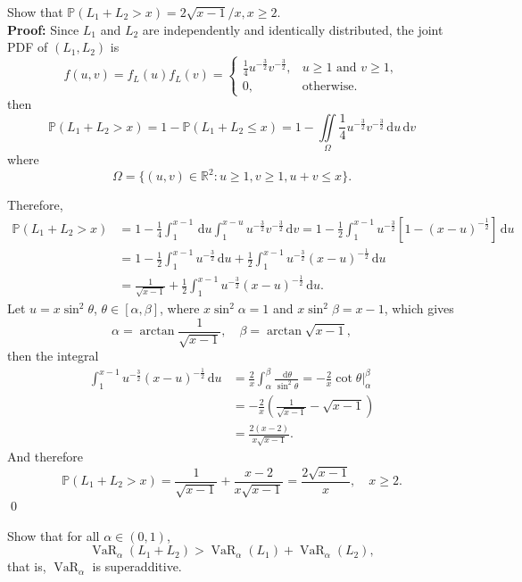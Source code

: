 \documentclass{MFM-hw} %
\newcommand{\VaR}{\operatorname{VaR}}
\newcommand{\real}{\mathbb{R}}
\newcommand{\dd}{\,\mathrm{d}}
\renewcommand{\P}{\mathbb{P}}
\begin{document}
\HWsubproblem
Show that $\P(L_1+L_2 > x) = 2\sqrt{x-1}/x, x\ge 2$.\\

\textbf{Proof: }Since $L_1$ and $L_2$ are independently and identically distributed, the joint PDF of $(L_1, L_2)$ is
\[
    f(u,v) = f_L(u)f_L(v) = 
    \begin{cases}
        \frac14u^{-\frac32}v^{-\frac32}, &u \ge 1 \text{ and } v \ge 1,\\
        0, &\text{otherwise}.
    \end{cases}
\] 
then
\[
    \P(L_1+L_2 > x) = 1- \P(L_1 + L_2 \le x) = 1-\iint\limits_{\Omega} \frac14u^{-\frac32}v^{-\frac32} \dd u\dd v
\]
where
\[
    \Omega = \{(u,v) \in \real^2: u \ge 1,v\ge 1,u+v \le x\}.
\]

Therefore,
\begin{align*}
        \P(L_1+L_2 > x) &= 1 - \frac14 \int_1^{x-1} \dd u \int_1^{x-u} u^{-\frac32}v^{-\frac32} \dd v = 1 - \frac{1}{2} \int_1^{x-1} u^{-\frac32}[1-(x-u)^{-\frac12}] \dd u \\
        & = 1 - \frac{1}{2} \int_1^{x-1}u^{-\frac32}\dd u + \frac{1}{2} \int_1^{x-1}u^{-\frac32}(x-u)^{-\frac12} \dd u \\
        & = \frac{1}{\sqrt{x-1}} + \frac12 \int_1^{x-1} u^{-\frac32}(x-u)^{-\frac12} \dd u.
\end{align*}
Let $u = x \sin^2 \theta$, $\theta \in [\alpha, \beta]$, where $x\sin^2\alpha = 1$ and $x\sin^2\beta = x-1$, which gives
\[
    \alpha = \arctan \frac{1}{\sqrt{x-1}}, \quad \beta = \arctan \sqrt{x-1},
\]
then the integral
\begin{align*}
    \int_1^{x-1} u^{-\frac32}(x-u)^{-\frac12} \dd u &= \frac{2}{x} \int_{\alpha}^{\beta} \frac{\dd \theta}{\sin^2 \theta} = -\frac{2}{x} \cot \theta \Bigg|_{\alpha}^{\beta} \\
    &= -\frac{2}{x}(\frac{1}{\sqrt{x-1}}-\sqrt{x-1}) \\
    &=\frac{2(x-2)}{x\sqrt{x-1}}. 
\end{align*}
And therefore
\[
    \P(L_1+L_2 > x) = \frac{1}{\sqrt{x-1}} + \frac{x-2}{x\sqrt{x-1}} = \frac{2\sqrt{x-1}}{x},\quad x\ge2. 
\]\qed
    
\HWsubproblem
Show that for all $\alpha \in (0, 1)$,
\[
    \VaR_{\alpha}(L_1+L_2) > \VaR_{\alpha}(L_1) + \VaR_{\alpha}(L_2),
\]
that is, $\VaR_{\alpha}$ is superadditive.\\
\end{document}
